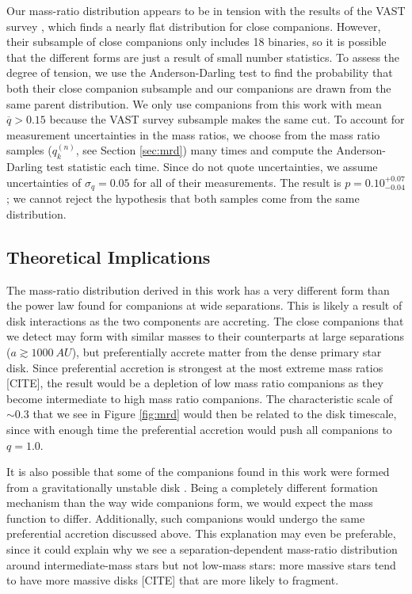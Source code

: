 \documentclass{emulateapj}
\begin{document}
Our mass-ratio distribution appears to be in tension with the results of the VAST survey \citep{DeRosa2014}, which finds a nearly flat distribution for close companions. However, their subsample of close companions only includes 18 binaries, so it is possible that the different forms are just a result of small number statistics. To assess the degree of tension, we use the Anderson-Darling  test \citep{Anderson1954} to find the probability that both their close companion subsample and our companions are drawn from the same parent distribution. We only use companions from this work with mean $\overline{q} > 0.15$ because the VAST survey subsample makes the same cut. To account for measurement uncertainties in the mass ratios, we choose from the mass ratio samples ($q_k^{(n)}$, see Section \ref{sec:mrd}) many times and compute the Anderson-Darling test statistic each time. Since \citet{DeRosa2014} do not quote uncertainties, we assume uncertainties of $\sigma_q = 0.05$ for all of their measurements. The result is $p = 0.10^{+0.07}_{-0.04}$; we cannot reject the hypothesis that both samples come from the same distribution.


\subsection{Theoretical Implications}
\label{subsec:theory}

The mass-ratio distribution derived in this work has a very different form than the power law found for companions at wide separations. This is likely a result of disk interactions as the two components are accreting. The close companions that we detect may form with similar masses to their counterparts at large separations ($a \gtrsim 1000\ AU$), but preferentially accrete matter from the dense primary star disk. Since preferential accretion is strongest at the most extreme mass ratios [CITE], the result would be a depletion of low mass ratio companions as they become intermediate to high mass ratio companions. The characteristic scale of $\sim 0.3$ that we see in Figure \ref{fig:mrd} would then be related to the disk timescale, since with enough time the preferential accretion would push all companions to $q = 1.0$. 

It is also possible that some of the companions found in this work were formed from a gravitationally unstable disk \citep[e.g.][]{Kratter2006, Stamatellos2011}. Being a completely different formation mechanism than the way wide companions form, we would expect the mass function to differ. Additionally, such companions would undergo the same preferential accretion discussed above. This explanation may even be preferable, since it could explain why we see a separation-dependent mass-ratio distribution around intermediate-mass stars but not low-mass stars: more massive stars tend to have more massive disks [CITE] that are more likely to fragment.
\end{document}
